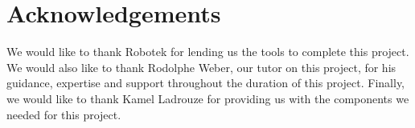 \newpage
\section*{Acknowledgements}


We would like to thank Robotek for lending us the tools to complete this project.
We would also like to thank Rodolphe Weber, our tutor on this project, for his guidance, expertise and support throughout the duration of this project.
Finally, we would like to thank Kamel Ladrouze for providing us with the components we needed for this project.

